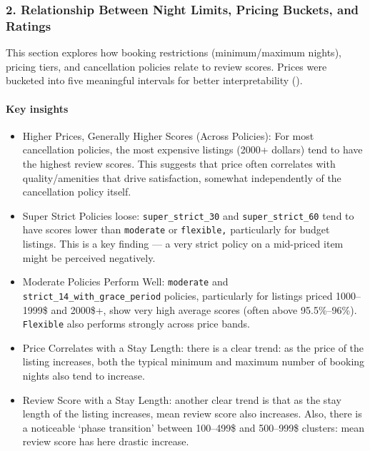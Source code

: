 \subsubsection*{2. Relationship Between Night Limits, Pricing Buckets, and Ratings }

This section explores how booking restrictions (minimum/maximum nights), pricing tiers, and cancellation policies relate to review scores. Prices were bucketed into five meaningful intervals for better interpretability ().

\vspace{0.5em}
\paragraph{Key insights}
\begin{itemize}
    \item Higher Prices, Generally Higher Scores (Across Policies): For most cancellation policies, the most expensive listings (2000+ dollars) tend to have the highest review scores. This suggests that price often correlates with quality/amenities that drive satisfaction, somewhat independently of the cancellation policy itself.
    \item Super Strict Policies loose: \texttt{super\_strict\_30} and \texttt{super\_strict\_60} tend to have scores lower than \texttt{moderate} or \texttt{flexible,} particularly for budget listings. This is a key finding --- a very strict policy on a mid-priced item might be perceived negatively.
    \item Moderate Policies Perform Well: \texttt{moderate} and \texttt{strict\_14\_with\_grace\_period} policies, particularly for listings priced 1000--1999\$ and 2000\$+, show very high average scores (often above 95.5\%--96\%). \texttt{Flexible} also performs strongly across price bands.
    \item Price Correlates with a Stay Length: there is a clear trend: as the price of the listing increases, both the typical minimum and maximum number of booking nights also tend to increase.
    \item Review Score with a Stay Length: another clear trend is that as the stay length of the listing increases, mean review score also increases. Also, there is a noticeable `phase transition' between 100--499\$ and 500--999\$ clusters: mean review score has here drastic increase.
\end{itemize}



